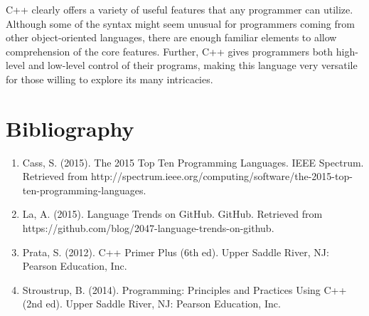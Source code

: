 \documentclass[11pt]{article}
\begin{document}
	C++ clearly offers a variety of useful features that any programmer can utilize.  Although some of the syntax might seem unusual for programmers coming from other object-oriented languages, there are enough familiar elements to allow comprehension of the core features.  Further, C++ gives programmers both high-level and low-level control of their programs, making this language very versatile for those willing to explore its many intricacies.  


\section{Bibliography}
\begin{enumerate}
	\item Cass, S.  (2015).  The 2015 Top Ten Programming Languages.  IEEE Spectrum.  Retrieved from http://spectrum.ieee.org/computing/software/the-2015-top-ten-programming-languages.
	\item La, A.  (2015).  Language Trends on GitHub.  GitHub.  Retrieved from https://github.com/blog/2047-language-trends-on-github.
	\item Prata, S.  (2012).  C++ Primer Plus (6th ed).  Upper Saddle River, NJ: Pearson Education, Inc.
	\item Stroustrup, B.  (2014).  Programming: Principles and Practices Using C++ (2nd ed).  Upper Saddle River, NJ: Pearson Education, Inc.
\end{enumerate}
\end{document}
